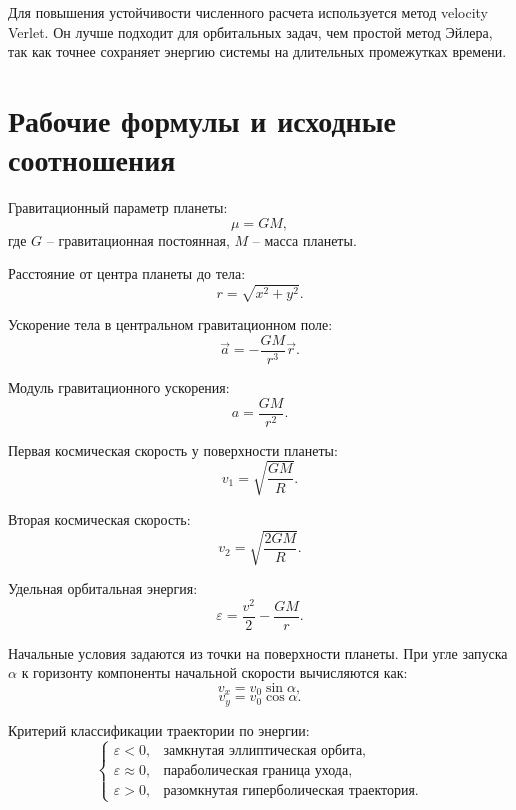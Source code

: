 \documentclass[12pt,a4paper]{article}
\begin{document}
Для повышения устойчивости численного расчета используется метод velocity Verlet. Он лучше подходит для орбитальных задач, чем простой метод Эйлера, так как точнее сохраняет энергию системы на длительных промежутках времени.

\section{Рабочие формулы и исходные соотношения}
Гравитационный параметр планеты:
\begin{equation}
    \mu = GM,
\end{equation}
где \(G\) -- гравитационная постоянная, \(M\) -- масса планеты.

Расстояние от центра планеты до тела:
\begin{equation}
    r = \sqrt{x^2+y^2}.
\end{equation}

Ускорение тела в центральном гравитационном поле:
\begin{equation}
    \vec a = -\frac{GM}{r^3}\vec r.
\end{equation}

Модуль гравитационного ускорения:
\begin{equation}
    a = \frac{GM}{r^2}.
\end{equation}

Первая космическая скорость у поверхности планеты:
\begin{equation}
    v_1 = \sqrt{\frac{GM}{R}}.
\end{equation}

Вторая космическая скорость:
\begin{equation}
    v_2 = \sqrt{\frac{2GM}{R}}.
\end{equation}

Удельная орбитальная энергия:
\begin{equation}
    \varepsilon = \frac{v^2}{2} - \frac{GM}{r}.
\end{equation}

Начальные условия задаются из точки на поверхности планеты. При угле запуска \(\alpha\) к горизонту компоненты начальной скорости вычисляются как:
\begin{equation}
    v_x = v_0 \sin \alpha,
\end{equation}
\begin{equation}
    v_y = v_0 \cos \alpha.
\end{equation}

Критерий классификации траектории по энергии:
\begin{equation}
\begin{cases}
\varepsilon < 0, & \text{замкнутая эллиптическая орбита},\\
\varepsilon \approx 0, & \text{параболическая граница ухода},\\
\varepsilon > 0, & \text{разомкнутая гиперболическая траектория}.
\end{cases}
\end{equation}
\end{document}
